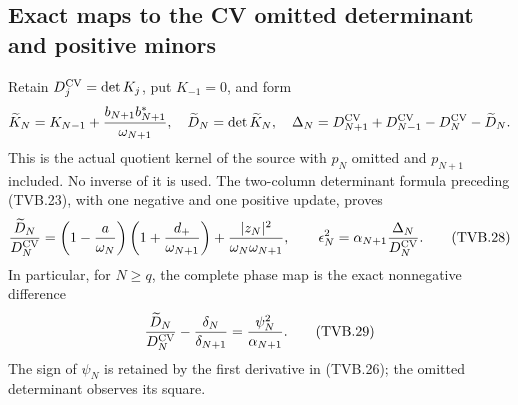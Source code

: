 \subsection[\hspace{0.4em}Exact maps to the CV omitted determinant and positive minors]{Exact maps to the CV omitted determinant and positive minors}

Retain $D_j^{\rm CV}=\det K_j$, put $K_{-1}=0$, and form
\[
 \widetilde K_N=K_{N-1}
        +\frac{b_{N+1}b_{N+1}^*}{\omega_{N+1}},\quad
 \widetilde D_N=\det\widetilde K_N,\quad
 \Delta_N=D_{N+1}^{\rm CV}+D_{N-1}^{\rm CV}
                         -D_N^{\rm CV}-\widetilde D_N.
\]
This is the actual quotient kernel of the source with $p_N$
omitted and $p_{N+1}$ included. No inverse of it is used.
The two-column determinant formula preceding (TVB.23), with one
negative and one positive update, proves
\[
 \frac{\widetilde D_N}{D_N^{\rm CV}}
 =\left(1-\frac a{\omega_N}\right)
       \left(1+\frac{d_+}{\omega_{N+1}}\right)
        +\frac{|z_N|^2}{\omega_N\omega_{N+1}},\qquad
 \epsilon_N^2=\alpha_{N+1}\frac{\Delta_N}{D_N^{\rm CV}}.
 \tag{TVB.28}
\]
In particular, for $N\ge q$, the complete phase map is the exact
nonnegative difference
\[
 \frac{\widetilde D_N}{D_N^{\rm CV}}
 -\frac{\delta_N}{\delta_{N+1}}
 =\frac{\psi_N^2}{\alpha_{N+1}}.
 \tag{TVB.29}
\]
The sign of $\psi_N$ is retained by the first derivative in
(TVB.26); the omitted determinant observes its square.

